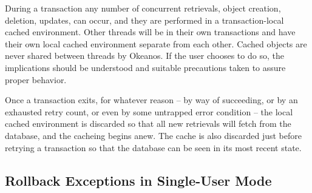 \documentclass[article,oneside]{memoir}
\begin{document}
During a transaction any number of concurrent retrievals, object creation, deletion, updates, can occur, and they are performed in a transaction-local cached environment. Other threads will be in their own transactions and have their own local cached environment separate from each other. Cached objects are never shared between threads by Okeanos. If the user chooses to do so, the implications should be understood and suitable precautions taken to assure proper behavior.

Once a transaction exits, for whatever reason -- by way of succeeding, or by an exhausted retry count, or even by some untrapped error condition -- the local cached environment is discarded so that all new retrievals will fetch from the database, and the cacheing begins anew. The cache is also discarded just before retrying a transaction so that the database can be seen in its most recent state.

\subsection{Rollback Exceptions in Single-User Mode}
\end{document}

